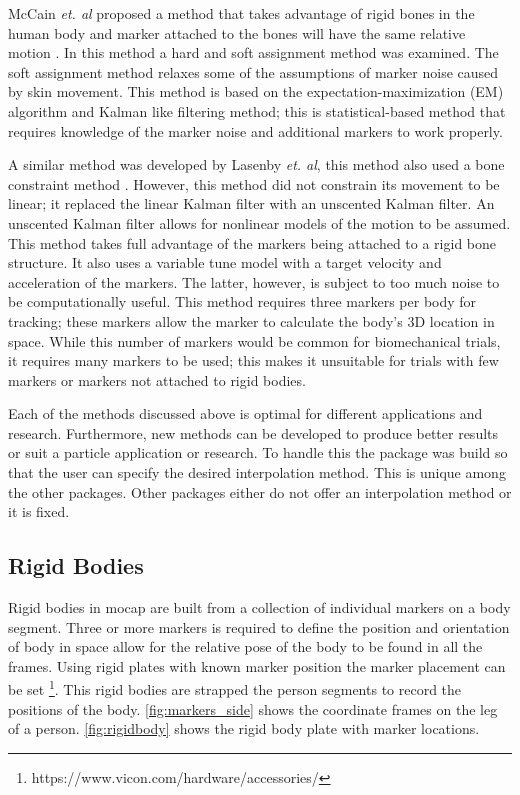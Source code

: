 McCain \textit{et. al} proposed a method that takes advantage of rigid bones in the human body and marker attached to the bones will have the same relative motion \cite{li2010bolero}. In this method a hard and soft assignment method was examined. The soft assignment method relaxes some of the assumptions of marker noise caused by skin movement. This method is based on the expectation-maximization (EM) algorithm and Kalman like filtering method; this is statistical-based method that requires knowledge of the marker noise and additional markers to work properly. 

A similar method was developed by Lasenby \textit{et. al}, this method also used a bone constraint method \cite{aristidou2013real}. However, this method did not constrain its movement to be linear; it replaced the linear Kalman filter with an unscented Kalman filter. An unscented Kalman filter allows for nonlinear models of the motion to be assumed. This method takes full advantage of the markers being attached to a rigid bone structure. It also uses a variable tune model with a target velocity and acceleration of the markers. The latter, however, is subject to too much noise to be computationally useful. This method requires three markers per body for tracking; these markers allow the marker to calculate the body's 3D location in space. While this number of markers would be common for biomechanical trials, it requires many markers to be used; this makes it unsuitable for trials with few markers or markers not attached to rigid bodies.

Each of the methods discussed above is optimal for different applications and research. Furthermore, new methods can be developed to produce better results or suit a particle application or research. To handle this the package was build so that the user can specify the desired interpolation method. This is unique among the other packages. Other packages either do not offer an interpolation method or it is fixed.  

\subsection{Rigid Bodies}

Rigid bodies in mocap are built from a collection of individual markers on a body segment. Three or more markers is required to define the position and orientation of body in space allow for the relative pose of the body to be found in all the frames. Using rigid plates with known marker position the marker placement can be set \footnote{https://www.vicon.com/hardware/accessories/}. This rigid bodies are strapped the person segments to record the positions of the body. \autoref{fig:markers_side} shows the coordinate frames on the leg of a person. \autoref{fig:rigidbody} shows the rigid body plate with marker locations. 

